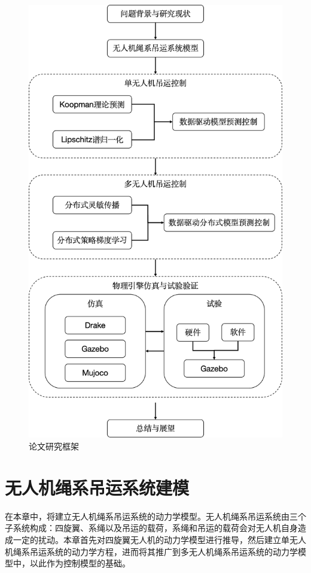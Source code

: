 \documentclass[lang=chs, degree=master, blindreview=true, winfonts=true]{yanputhesis}
\begin{document}
\begin{figure}[hbt!]
	\centering
	\includegraphics[width=28pc]{picture/1_0.png} 
	\caption{论文研究框架} \label{1_0}
\end{figure}

\cleardoublepage

\chapter{无人机绳系吊运系统建模}
在本章中，将建立无人机绳系吊运系统的动力学模型。无人机绳系吊运系统由三个子系统构成：四旋翼、系绳以及吊运的载荷，系绳和吊运的载荷会对无人机自身造成一定的扰动。本章首先对四旋翼无人机的动力学模型进行推导，然后建立单无人机绳系吊运系统的动力学方程，进而将其推广到多无人机绳系吊运系统的动力学模型中，以此作为控制模型的基础。
\end{document}
